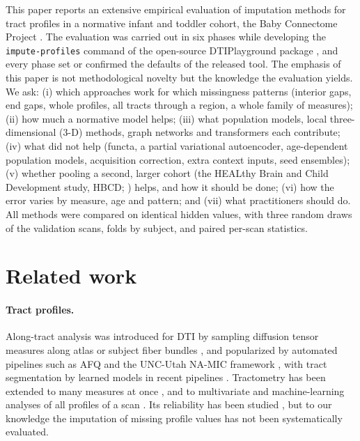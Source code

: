 \documentclass[11pt]{article}
\begin{document}
This paper reports an extensive empirical evaluation of imputation methods for tract profiles in a normative infant
and toddler cohort, the Baby Connectome Project \citep[BCP;][]{howell2019bcp}. The evaluation was carried out in six
phases while developing the \texttt{impute-profiles} command of the open-source DTIPlayground package
\citep{dtiplayground}, and every phase set or confirmed the defaults of the released tool. The emphasis of this paper
is not methodological novelty but the knowledge the evaluation yields. We ask:
(i) which approaches work for which missingness patterns (interior gaps, end gaps, whole profiles, all tracts through a
region, a whole family of measures);
(ii) how much a normative model helps;
(iii) what population models, local three-dimensional (3-D) methods, graph networks and transformers each contribute;
(iv) what did not help (functa, a partial variational autoencoder, age-dependent population models, acquisition
correction, extra context inputs, seed ensembles);
(v) whether pooling a second, larger cohort (the HEALthy Brain and Child Development study, HBCD;
\citealp{volkow2021hbcd,dean2024hbcdmri}) helps, and how it should be done;
(vi) how the error varies by measure, age and pattern; and
(vii) what practitioners should do.
All methods were compared on identical hidden values, with three random draws of the validation scans, folds by
subject, and paired per-scan statistics.

\section{Related work}

\paragraph{Tract profiles.} Along-tract analysis was introduced for DTI by sampling diffusion tensor measures along
atlas or subject fiber bundles \citep{goodlett2009group,colby2012alongtract}, and popularized by automated pipelines
such as AFQ \citep{yeatman2012afq} and the UNC-Utah NA-MIC framework \citep{verde2014unc}, with tract segmentation by
learned models in recent pipelines \citep{wasserthal2018tractseg}. Tractometry has been extended to many measures at once
\citep{chamberland2019dimensionality}, and to multivariate and machine-learning analyses of all profiles of a scan
\citep{richiehalford2021afqinsight}. Its reliability has been studied \citep{kruper2021reliability}, but to our knowledge
the imputation of missing profile values has not been systematically evaluated.
\end{document}
